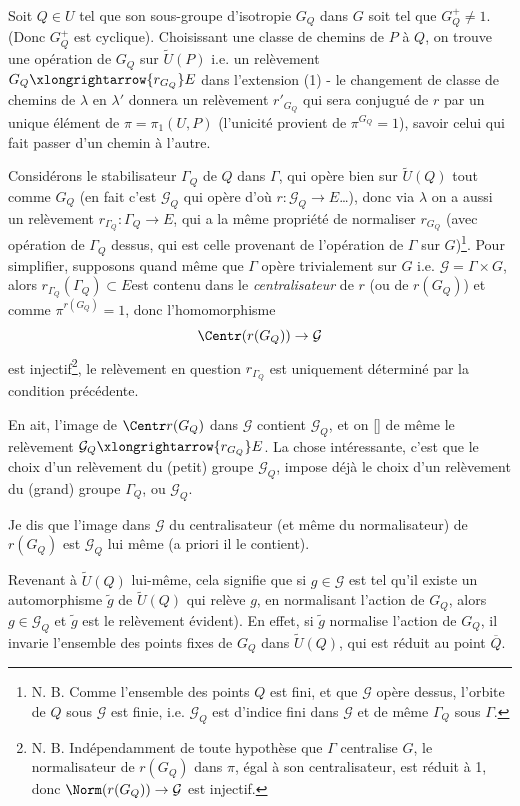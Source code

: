 Soit $Q \in U$ tel que son sous-groupe d'isotropie $G_Q$ dans $G$ soit tel que $G^+_Q \neq 1$. (Donc $G^+_Q$ est cyclique). Choisissant une classe de chemins de $P$ à $Q$, on trouve une opération de $G_Q$ sur $\widetilde{U}(P)$ i.e. un relèvement $G_Q \xlongrightarrow{r_{G_Q}} E$ dans l'extension (1) - le changement de classe de chemins de $\lambda$ en $\lambda'$ donnera un relèvement $r'_{G_Q}$ qui sera conjugué de $r$ par un unique élément de $\pi = \pi_1(U, P)$ (l'unicité provient de $\pi^{G_Q} = {1}$), savoir celui qui fait passer d'un chemin à l'autre.

Considérons le stabilisateur $\Gamma_Q$ de $Q$ dans $\Gamma$, qui opère bien sur $\widetilde{U}(Q)$ tout comme $G_Q$ (en fait c'est $\mathcal{G}_Q$ qui opère d'où $r: \mathcal{G}_Q \to E$\dots), donc via $\lambda$ on a aussi un relèvement $r_{\Gamma_Q}: \Gamma_Q \to E$, qui a la même propriété de normaliser $r_{G_Q}$ (avec opération de $\Gamma_Q$ dessus, qui est celle provenant de l'opération de $\Gamma$ sur $G$)\footnote{N. B. Comme l'ensemble des points $Q$ est fini, et que $\mathcal{G}$ opère dessus, l'orbite de $Q$ sous $\mathcal{G}$ est finie, i.e. $\mathcal{G}_Q$ est d'indice fini dans $\mathcal{G}$ et de même $\Gamma_Q$ sous $\Gamma$.}. Pour simplifier, supposons quand même que $\Gamma$ opère trivialement sur $G$ i.e. $\mathcal{G} = \Gamma \times G$, alors $r_{\Gamma_Q}(\Gamma_Q) \subset  E$est contenu dans le \emph{centralisateur} de $r$ (ou de $r(G_Q)$) et comme $\pi^{r(G_Q)} = 1$, donc l'homomorphisme
$$
\Centr(r(G_Q)) \to \mathcal{G}
$$
est injectif\footnote{N. B. Indépendamment de toute hypothèse que $\Gamma$ centralise $G$, le normalisateur de $r(G_Q)$ dans $\pi$, égal à son centralisateur, est réduit à 1, donc $\Norm(r(G_Q)) \to \mathcal{G}$ est injectif.}, le relèvement en question $r_{\Gamma_Q}$ est uniquement déterminé par la condition précédente.

En ait, l'image de $\Centr r(G_Q)$ dans $\mathcal{G}$ contient $\mathcal{G}_Q$, et on [] de même le relèvement $\mathcal{G}_Q \xlongrightarrow{r_{G_Q}} E$. La chose intéressante, c'est que le choix d'un relèvement du (petit) groupe $\mathcal{G}_Q$, impose déjà le choix d'un relèvement du (grand) groupe $\Gamma_Q$, ou $\mathcal{G}_Q$.

Je dis   que l'image dans $\mathcal{G}$ du centralisateur (et même du normalisateur) de $r(G_Q)$ est $\mathcal{G}_Q$ lui même (a priori il le contient).

Revenant à $\widetilde{U}(Q)$ lui-même, cela signifie que si $g \in \mathcal{G}$ est tel qu'il existe un automorphisme $\widetilde{g}$ de $\widetilde{U}(Q)$ qui relève $g$, en normalisant l'action de $G_Q$, alors $g \in \mathcal{G}_Q$ et $\widetilde{g}$ est le relèvement évident). En effet, si $\widetilde{g}$ normalise l'action de $G_Q$, il invarie l'ensemble des points fixes de $G_Q$ dans $\widetilde{U}(Q)$, qui est réduit au point $\overline{Q}$.

